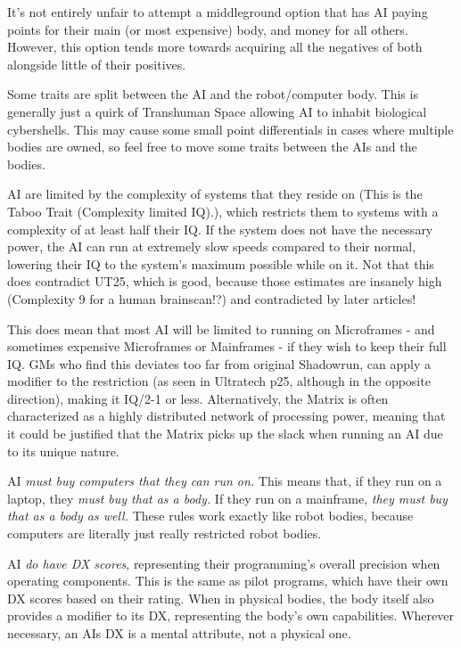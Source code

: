 \begin{multicols*}{3}
\begin{itemize}
		It's not entirely unfair to attempt a middleground option that has AI paying points for their main (or most expensive) body, and money for all others. However, this option tends more towards acquiring all the negatives of both alongside little of their positives.
		
	\end{itemize}
	
	Some traits are split between the AI and the robot/computer body. This is generally just a quirk of Transhuman Space allowing AI to inhabit biological cybershells. This may cause some small point differentials in cases where multiple bodies are owned, so feel free to move some traits between the AIs and the bodies.
	
	AI are limited by the complexity of systems that they reside on (This is the Taboo Trait (Complexity limited IQ).), which restricts them to systems with a complexity of at least half their IQ. If the system does not have the necessary power, the AI can run at extremely slow speeds compared to their normal, lowering their IQ to the system's maximum possible while on it. Not that this does contradict UT25, which is good, because those estimates are insanely high (Complexity 9 for a human brainscan!?) and contradicted by later articles!
	
	This does mean that most AI will be limited to running on Microframes - and sometimes expensive Microframes or Mainframes - if they wish to keep their full IQ. GMs who find this deviates too far from original Shadowrun, can apply a modifier to the restriction (as seen in Ultratech p25, although in the opposite direction), making it IQ/2-1 or less. Alternatively, the Matrix is often characterized as a highly distributed network of processing power, meaning that it could be justified that the Matrix picks up the slack when running an AI due to its unique nature.
	
	AI \textit{must buy computers that they can run on.} This means that, if they run on a laptop, they \textit{must buy that as a body.} If they run on a mainframe, \textit{they must buy that as a body as well.} These rules work exactly like robot bodies, because computers are literally just really restricted robot bodies.
	
	AI \textit{do have DX scores}, representing their programming's overall precision when operating components. This is the same as pilot programs, which have their own DX scores based on their rating. When in physical bodies, the body itself also provides a modifier to its DX, representing the body's own capabilities. Wherever necessary, an AIs DX is a mental attribute, not a physical one.
	

\end{multicols*}
